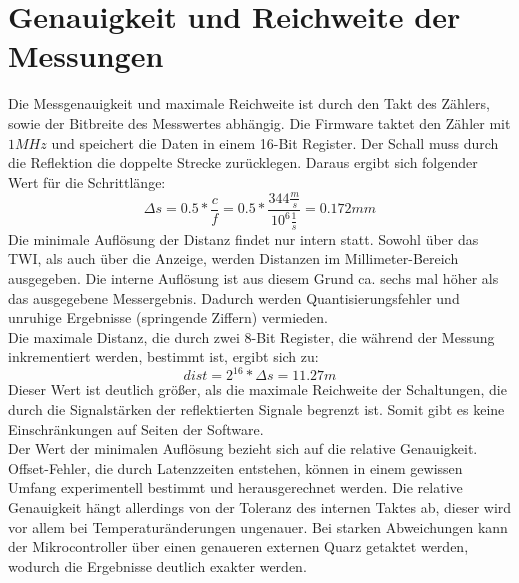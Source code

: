 \section{Genauigkeit und Reichweite der Messungen}
Die Messgenauigkeit und maximale Reichweite ist durch den Takt des Zählers, sowie der Bitbreite des Messwertes abhängig. Die Firmware taktet den Zähler mit $1MHz$ und speichert die Daten in einem 16-Bit Register. Der Schall muss durch die Reflektion die doppelte Strecke zurücklegen. Daraus ergibt sich folgender Wert für die Schrittlänge:
\begin{equation}
\Delta s = 0.5*\frac{c}{f} = 0.5 * \frac{344\frac{m}{s}}{10^6 \frac{1}{s}} = 0.172 mm
\end{equation}
Die minimale Auflösung der Distanz findet nur intern statt. Sowohl über das \ac{TWI}, als auch über die Anzeige, werden Distanzen im Millimeter-Bereich ausgegeben. Die interne Auflösung ist aus diesem Grund ca. sechs mal höher als das ausgegebene Messergebnis. Dadurch werden Quantisierungsfehler und unruhige Ergebnisse (springende Ziffern) vermieden.\\
Die maximale Distanz, die durch zwei 8-Bit Register, die während der Messung inkrementiert werden, bestimmt ist, ergibt sich zu:
\begin{equation}
dist = 2^{16} * \Delta s = 11.27 m
\end{equation}
Dieser Wert ist deutlich größer, als die maximale Reichweite der Schaltungen, die durch die Signalstärken der reflektierten Signale begrenzt ist. Somit gibt es keine Einschränkungen auf Seiten der Software.\\
Der Wert der minimalen Auflösung bezieht sich auf die relative Genauigkeit. Offset-Fehler, die durch Latenzzeiten entstehen, können in einem gewissen Umfang experimentell bestimmt und herausgerechnet werden. Die relative Genauigkeit hängt allerdings von der Toleranz des internen Taktes ab, dieser wird vor allem bei Temperaturänderungen ungenauer. Bei starken Abweichungen kann der Mikrocontroller über einen genaueren externen Quarz getaktet werden, wodurch die Ergebnisse deutlich exakter werden.


